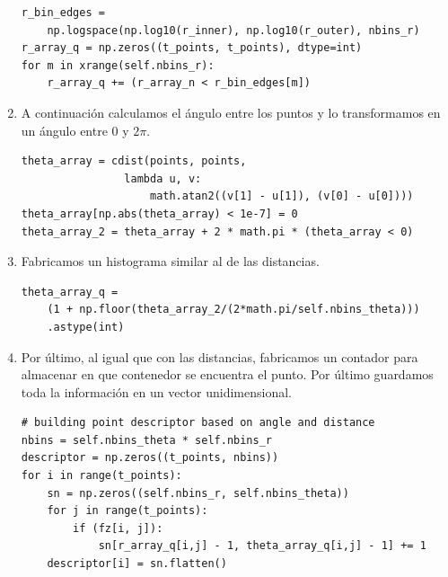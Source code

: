 \documentclass[size=a4, parskip=half, titlepage=false, toc=flat, toc=bib, 12pt]{scrartcl}
\begin{document}
\begin{enumerate}
\begin{verbatim}
r_bin_edges =
    np.logspace(np.log10(r_inner), np.log10(r_outer), nbins_r)
r_array_q = np.zeros((t_points, t_points), dtype=int)
for m in xrange(self.nbins_r):
    r_array_q += (r_array_n < r_bin_edges[m])
\end{verbatim}

\item A continuación calculamos el ángulo entre los puntos y lo transformamos en un ángulo entre 0 y $2\pi$.
\begin{verbatim}
theta_array = cdist(points, points,
                lambda u, v:
                    math.atan2((v[1] - u[1]), (v[0] - u[0])))
theta_array[np.abs(theta_array) < 1e-7] = 0
theta_array_2 = theta_array + 2 * math.pi * (theta_array < 0)
\end{verbatim}
\item Fabricamos un histograma similar al de las distancias.
\begin{verbatim}
theta_array_q =
    (1 + np.floor(theta_array_2/(2*math.pi/self.nbins_theta)))
    .astype(int)
\end{verbatim}
\item Por último, al igual que con las distancias, fabricamos un contador para almacenar en que contenedor se encuentra el punto. Por último guardamos toda la información en un vector unidimensional.
\begin{verbatim}
# building point descriptor based on angle and distance
nbins = self.nbins_theta * self.nbins_r
descriptor = np.zeros((t_points, nbins))
for i in range(t_points):
    sn = np.zeros((self.nbins_r, self.nbins_theta))
    for j in range(t_points):
        if (fz[i, j]):
            sn[r_array_q[i,j] - 1, theta_array_q[i,j] - 1] += 1
    descriptor[i] = sn.flatten()
\end{verbatim}
\end{enumerate}
\end{document}
